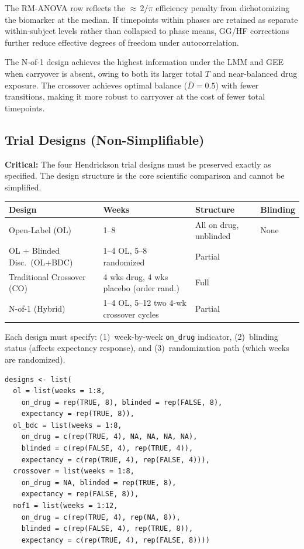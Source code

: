 \documentclass[11pt,letterpaper]{article}
\begin{document}
The RM-ANOVA row reflects the ${\approx}\,2/\pi$ efficiency penalty from
dichotomizing the biomarker at the median. If timepoints within phases
are retained as separate within-subject levels rather than collapsed to
phase means, GG/HF corrections further reduce effective degrees of
freedom under autocorrelation.

The N-of-1 design achieves the highest information under the LMM and GEE
when carryover is absent, owing to both its larger total $T$ and
near-balanced drug exposure. The crossover achieves optimal balance
($\bar{D} = 0.5$) with fewer transitions, making it more robust to
carryover at the cost of fewer total timepoints.


\subsection{Trial Designs (Non-Simplifiable)}

\textbf{Critical:} The four Hendrickson trial designs must be preserved
exactly as specified. The design structure is the core scientific
comparison and cannot be simplified.

\begin{table}[h]
\centering\small
\begin{tabular}{@{}llll@{}}
\toprule
Design & Weeks & Structure & Blinding \\
\midrule
Open-Label (OL) & 1--8 & All on drug, unblinded & None \\
OL + Blinded Disc.\ (OL+BDC) & 1--4 OL, 5--8 randomized & Partial \\
Traditional Crossover (CO) & 4 wks drug, 4 wks placebo (order rand.) & Full \\
N-of-1 (Hybrid) & 1--4 OL, 5--12 two 4-wk crossover cycles & Partial \\
\bottomrule
\end{tabular}
\end{table}

Each design must specify: (1)~week-by-week \texttt{on\_drug} indicator,
(2)~blinding status (affects expectancy response), and
(3)~randomization path (which weeks are randomized).

\begin{Verbatim}[fontsize=\small]
designs <- list(
  ol = list(weeks = 1:8,
    on_drug = rep(TRUE, 8), blinded = rep(FALSE, 8),
    expectancy = rep(TRUE, 8)),
  ol_bdc = list(weeks = 1:8,
    on_drug = c(rep(TRUE, 4), NA, NA, NA, NA),
    blinded = c(rep(FALSE, 4), rep(TRUE, 4)),
    expectancy = c(rep(TRUE, 4), rep(FALSE, 4))),
  crossover = list(weeks = 1:8,
    on_drug = NA, blinded = rep(TRUE, 8),
    expectancy = rep(FALSE, 8)),
  nof1 = list(weeks = 1:12,
    on_drug = c(rep(TRUE, 4), rep(NA, 8)),
    blinded = c(rep(FALSE, 4), rep(TRUE, 8)),
    expectancy = c(rep(TRUE, 4), rep(FALSE, 8))))
\end{Verbatim}
\end{document}
